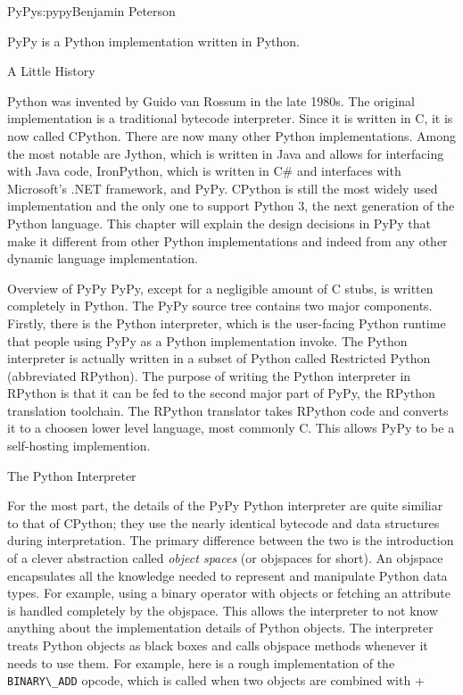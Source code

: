 \begin{aosachapter}{PyPy}{s:pypy}{Benjamin Peterson}

PyPy is a Python implementation written in Python.

\begin{aosasect1}{A Little History}

Python was invented by Guido van Rossum in the late 1980s. The original
implementation is a traditional bytecode interpreter. Since it is written in C,
it is now called CPython. There are now many other Python implementations. Among
the most notable are Jython, which is written in Java and allows for interfacing
with Java code, IronPython, which is written in C# and interfaces with
Microsoft's .NET framework, and PyPy. CPython is still the most widely used
implementation and the only one to support Python 3, the next generation of the
Python language. This chapter will explain the design decisions in PyPy that
make it different from other Python implementations and indeed from any other
dynamic language implementation.

\end{aosasect1}

\begin{aosasect1}{Overview of PyPy}
PyPy, except for a negligible amount of C stubs, is written completely in
Python. The PyPy source tree contains two major components. Firstly, there is
the Python interpreter, which is the user-facing Python runtime that people
using PyPy as a Python implementation invoke. The Python interpreter is actually
written in a subset of Python called Restricted Python (abbreviated
RPython). The purpose of writing the Python interpreter in RPython is that it
can be fed to the second major part of PyPy, the RPython translation
toolchain. The RPython translator takes RPython code and converts it to a
choosen lower level language, most commonly C. This allows PyPy to be a
self-hosting implemention.

\end{aosasect1}

\begin{aosasect1}{The Python Interpreter}

For the most part, the details of the PyPy Python interpreter are quite similiar
to that of CPython; they use the nearly identical bytecode and data structures
during interpretation. The primary difference between the two is the
introduction of a clever abstraction called \emph{object spaces} (or objspaces
for short). An objspace encapsulates all the knowledge needed to represent and
manipulate Python data types. For example, using a binary operator with objects
or fetching an attribute is handled completely by the objspace. This allows the
interpreter to not know anything about the implementation details of Python
objects. The interpreter treats Python objects as black boxes and calls objspace
methods whenever it needs to use them. For example, here is a rough
implementation of the \verb+BINARY\_ADD+ opcode, which is called when two
objects are combined with +


\end{aosasect1}
\end{aosachapter}
